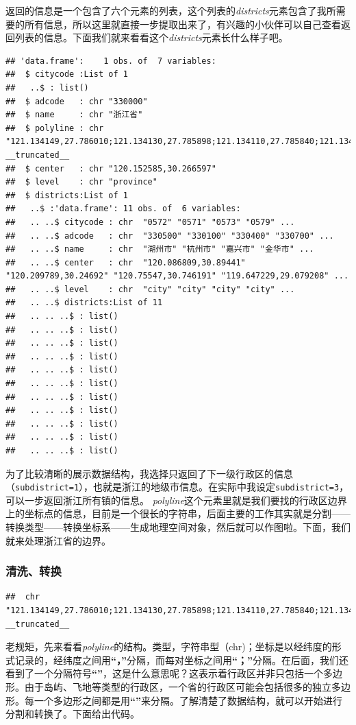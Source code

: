 \documentclass[]{article}
\begin{document}
返回的信息是一个包含了六个元素的列表，这个列表的\emph{districts}元素包含了我所需要的所有信息，所以这里就直接一步提取出来了，有兴趣的小伙伴可以自己查看返回列表的信息。下面我们就来看看这个\emph{districts}元素长什么样子吧。

\begin{verbatim}
## 'data.frame':    1 obs. of  7 variables:
##  $ citycode :List of 1
##   ..$ : list()
##  $ adcode   : chr "330000"
##  $ name     : chr "浙江省"
##  $ polyline : chr "121.134149,27.786010;121.134130,27.785898;121.134110,27.785840;121.134079,27.785817;121.134009,27.785782;121.13"| __truncated__
##  $ center   : chr "120.152585,30.266597"
##  $ level    : chr "province"
##  $ districts:List of 1
##   ..$ :'data.frame': 11 obs. of  6 variables:
##   .. ..$ citycode : chr  "0572" "0571" "0573" "0579" ...
##   .. ..$ adcode   : chr  "330500" "330100" "330400" "330700" ...
##   .. ..$ name     : chr  "湖州市" "杭州市" "嘉兴市" "金华市" ...
##   .. ..$ center   : chr  "120.086809,30.89441" "120.209789,30.24692" "120.75547,30.746191" "119.647229,29.079208" ...
##   .. ..$ level    : chr  "city" "city" "city" "city" ...
##   .. ..$ districts:List of 11
##   .. .. ..$ : list()
##   .. .. ..$ : list()
##   .. .. ..$ : list()
##   .. .. ..$ : list()
##   .. .. ..$ : list()
##   .. .. ..$ : list()
##   .. .. ..$ : list()
##   .. .. ..$ : list()
##   .. .. ..$ : list()
##   .. .. ..$ : list()
##   .. .. ..$ : list()
\end{verbatim}

为了比较清晰的展示数据结构，我选择只返回了下一级行政区的信息（\texttt{subdistrict=1}），也就是浙江的地级市信息。在实际中我设定\texttt{subdistrict=3}，可以一步返回浙江所有镇的信息。
\emph{polyline}这个元素里就是我们要找的行政区边界上的坐标点的信息，目前是一个很长的字符串，后面主要的工作其实就是分割------转换类型------转换坐标系------生成地理空间对象，然后就可以作图啦。下面，我们就来处理浙江省的边界。

\subsubsection{清洗、转换}

\begin{verbatim}
##  chr "121.134149,27.786010;121.134130,27.785898;121.134110,27.785840;121.134079,27.785817;121.134009,27.785782;121.13"| __truncated__
\end{verbatim}

老规矩，先来看看\emph{polyline}的结构。类型，字符串型（chr)；坐标是以经纬度的形式记录的，经纬度之间用\textbf{``，''}分隔，而每对坐标之间用\textbf{``；''}分隔。在后面，我们还看到了一个分隔符号\textbf{``\textbar{}''}，这是什么意思呢？这表示着行政区并非只包括一个多边形。由于岛屿、飞地等类型的行政区，一个省的行政区可能会包括很多的独立多边形。每一个多边形之间都是用\textbf{``\textbar{}''}来分隔。了解清楚了数据结构，就可以开始进行分割和转换了。下面给出代码。
\end{document}
